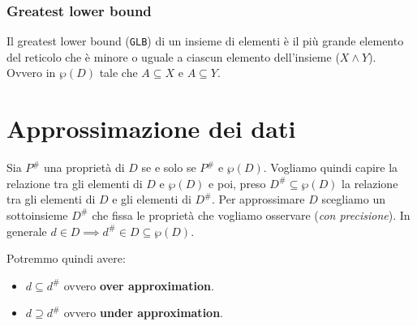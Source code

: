 \subsubsection{Greatest lower bound}
Il greatest lower bound (\verb|GLB|) di un insieme di elementi è il più grande
elemento del reticolo che è minore o uguale a ciascun elemento dell'insieme ($X \land Y$).
Ovvero in $\wp(D)$ tale che $A \subseteq X$ e $A \subseteq Y$.
\begin{figure}[H]
  \centering
\end{figure}
\section{Approssimazione dei dati}
Sia $P^\#$ una proprietà di $D$ se e solo se $P^\#$ e $\wp(D)$. Vogliamo quindi capire la relazione tra gli 
elementi di $D$ e $\wp(D)$ e poi, preso $D^\# \subseteq \wp(D)$ la relazione tra gli elementi di $D$ e gli elementi 
di $D^\#$.
Per approssimare $D$ scegliamo un sottoinsieme $D^\#$ che fissa le proprietà che vogliamo osservare (\textit{con precisione}).
In generale $d \in D \implies d^\# \in D \subseteq \wp(D)$.

Potremmo quindi avere:
\begin{itemize}
  \item $d \subseteq d^\#$ ovvero \textbf{over approximation}.
  \item $d \supseteq d^\#$ ovvero \textbf{under approximation}.
\end{itemize}
